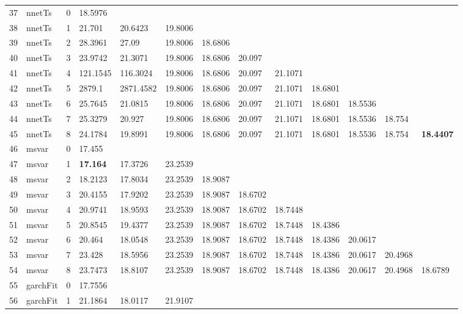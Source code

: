 \documentclass[10pt,a4paper]{article}
\begin{document}
\begin{table}[ht]
\begin{tabular}{rlrllllllllll}
   \hline
37 & nnetTs &     0 & 18.5976 &  &  &  &  &  &  &  &  &  \\ 
  38 & nnetTs &     1 & 21.701 & 20.6423 & 19.8006 &  &  &  &  &  &  &  \\ 
  39 & nnetTs &     2 & 28.3961 & 27.09 & 19.8006 & 18.6806 &  &  &  &  &  &  \\ 
  40 & nnetTs &     3 & 23.9742 & 21.3071 & 19.8006 & 18.6806 & 20.097 &  &  &  &  &  \\ 
  41 & nnetTs &     4 & 121.1545 & 116.3024 & 19.8006 & 18.6806 & 20.097 & 21.1071 &  &  &  &  \\ 
  42 & nnetTs &     5 & 2879.1 & 2871.4582 & 19.8006 & 18.6806 & 20.097 & 21.1071 & 18.6801 &  &  &  \\ 
  43 & nnetTs &     6 & 25.7645 & 21.0815 & 19.8006 & 18.6806 & 20.097 & 21.1071 & 18.6801 & 18.5536 &  &  \\ 
  44 & nnetTs &     7 & 25.3279 & 20.927 & 19.8006 & 18.6806 & 20.097 & 21.1071 & 18.6801 & 18.5536 & 18.754 &  \\ 
  45 & nnetTs &     8 & 24.1784 & 19.8991 & 19.8006 & 18.6806 & 20.097 & 21.1071 & 18.6801 & 18.5536 & 18.754 & \textbf{18.4407} \\ 
   \hline
46 & msvar &     0 & 17.455 &  &  &  &  &  &  &  &  &  \\ 
  47 & msvar &     1 & \textbf{17.164} & 17.3726 & 23.2539 &  &  &  &  &  &  &  \\ 
  48 & msvar &     2 & 18.2123 & 17.8034 & 23.2539 & 18.9087 &  &  &  &  &  &  \\ 
  49 & msvar &     3 & 20.4155 & 17.9202 & 23.2539 & 18.9087 & 18.6702 &  &  &  &  &  \\ 
  50 & msvar &     4 & 20.9741 & 18.9593 & 23.2539 & 18.9087 & 18.6702 & 18.7448 &  &  &  &  \\ 
  51 & msvar &     5 & 20.8545 & 19.4377 & 23.2539 & 18.9087 & 18.6702 & 18.7448 & 18.4386 &  &  &  \\ 
  52 & msvar &     6 & 20.464 & 18.0548 & 23.2539 & 18.9087 & 18.6702 & 18.7448 & 18.4386 & 20.0617 &  &  \\ 
  53 & msvar &     7 & 23.428 & 18.5956 & 23.2539 & 18.9087 & 18.6702 & 18.7448 & 18.4386 & 20.0617 & 20.4968 &  \\ 
  54 & msvar &     8 & 23.7473 & 18.8107 & 23.2539 & 18.9087 & 18.6702 & 18.7448 & 18.4386 & 20.0617 & 20.4968 & 18.6789 \\ 
   \hline
55 & garchFit &     0 & 17.7556 &  &  &  &  &  &  &  &  &  \\ 
  56 & garchFit &     1 & 21.1864 & 18.0117 & 21.9107 &  &  &  &  &  &  &  \\ 

\end{tabular}
\end{table}
\end{document}
